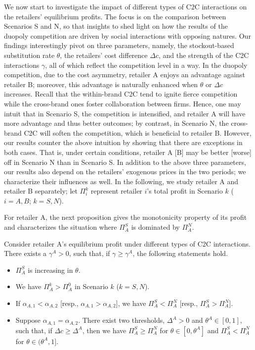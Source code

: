 \documentclass[nonblindrev,copyedit]{informs1}
\begin{document}
We now start to investigate the impact of different types of C2C interactions on the retailers' equilibrium profits. The focus is on the comparison between Scenarios S and N, so that insights to shed light on how the results of the duopoly competition are driven by social interactions with opposing natures. Our findings interestingly pivot on three parameters, namely, the stockout-based substitution rate $\theta$, the retailers' cost difference $\Delta c$, and the strength of the C2C interactions $\gamma$, all of which reflect the competition level in a way. In the duopoly competition, due to the cost asymmetry, retailer A enjoys an advantage against retailer B; moreover, this advantage is naturally enhanced when $\theta$ or $\Delta c$ increases. Recall that the within-brand C2C tend to ignite fierce competition while the cross-brand ones foster collaboration between firms. Hence, one may intuit that in Scenario S, the competition is intensified, and retailer A will have more advantage and thus better outcomes; by contrast, in Scenario N, the cross-brand C2C will soften the competition, which is beneficial to retailer B. However, our results counter the above intuition by showing that there are exceptions in both cases. That is, under certain conditions, retailer A [B] may be better [worse] off in Scenario N than in Scenario S. In addition to the above three parameters, our results also depend on the retailers' exogenous prices in the two periods; we characterize their influences as well. In the following, we study retailer A and retailer B separately; let $\Pi^k_i$ represent retailer $i$'s total profit in Scenario $k$ ($i=A,B$; $k=S, N$).

For retailer A, the next proposition gives the monotonicity property of its profit and characterizes the situation where $\Pi^S_{A}$ is dominated by $\Pi^N_{A}$.

\begin{proposition}
\label{prop:pfta}
Consider retailer A's equilibrium profit under different types of C2C interactions. There exists a $\gamma^A>0$, such that, if $\gamma \geq \gamma^A$, the following statements hold.
\begin{itemize}
\item[(a)] $\Pi^S_{A}$ is increasing in $\theta$.
\item[(b)] We have $\Pi^k_{A} > \Pi^0_{A}$ in Scenario $k$ ($k = S, N$).
\item[(c1)] If $\alpha_{A,1} < \alpha_{A,2}$ [resp., $\alpha_{A,1} > \alpha_{A,2}$], we have $\Pi^S_{A} <\Pi^N_{A}$ [resp., $\Pi^S_{A} > \Pi^N_{A}$].
\item[(c2)] Suppose $\alpha_{A,1} = \alpha_{A,2}$. There exist two thresholds, $\Delta^A > 0 $ and $\theta^A \in [0,1]$, such that, if $\Delta c \geq \Delta^A$, then we have $\Pi^S_{A} \geq \Pi^N_{A}$ for $\theta \in [0, \theta^A]$ and $\Pi^S_{A} < \Pi^N_{A}$ for $\theta \in (\theta^A,1]$.
\end{itemize}
\end{proposition}
\end{document}
